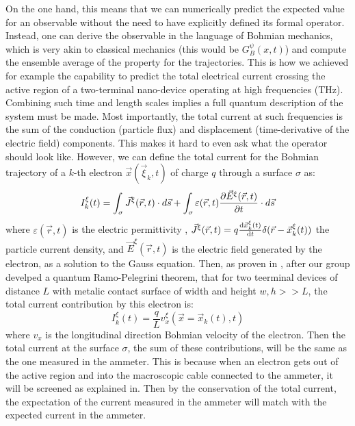 \documentclass[11pt, a4paper]{article} %
\begin{document}
On the one hand, this means that we can numerically predict the expected value for an observable without the need to have explicitly defined its formal operator. Instead, one can derive the observable in the language of Bohmian mechanics, which is very akin to classical mechanics (this would be $G^\psi_B(x,t)$) and compute the ensemble average of the property for the trajectories. This is how we achieved for example the capability to predict the total electrical current crossing the active region of a two-terminal nano-device operating at high frequencies (THz). Combining such time and length scales implies a full quantum description of the system must be made. Most importantly, the total current at such frequencies is the sum of the conduction (particle flux) and displacement (time-derivative of the electric field) components. This makes it hard to even ask what the operator should look like. However, we can define the total current for the Bohmian trajectory of a $k$-th electron $\vec{x}(\vec{\xi}_k,t)$ of charge $q$ through a surface $\sigma$ as:
\begin{equation}
I_k^\xi(t)=\int_\sigma \vec{J}^\xi(\vec{r},t)\cdot d\vec{s}+\int_\sigma \varepsilon(\vec{r},t)\pdv{\vec{E}^\xi(\vec{r},t)}{t}\cdot d\vec{s}
\end{equation}
where $\varepsilon(\vec{r},t)$ is the electric permittivity , $\vec{J}^\xi(\vec{r},t)=q\dv{\vec{x}_k^\xi(t)}{t}\delta(\vec{r}-\vec{x}_k^\xi(t))$ the particle current density, and $\vec{E}^\xi(\vec{r},t)$ is the electric field generated by the electron, as a solution to the Gauss equation. Then, as proven in \cite{}, after our group develped a quantum Ramo-Pelegrini theorem, that for two teerminal devices of distance $L$ with metalic contact surface of width and height $w,h>>L$, the total current contribution by this electron is:
\begin{equation}
I^\xi_k(t)=\frac{q}{L}v_x^\xi(\vec{x}=\vec{x}_k(t), t)
\end{equation} 
where $v_x$ is the longitudinal direction Bohmian velocity of the electron. Then the total current at the surface $\sigma$, the sum of these contributions, will be the same as the one measured in the ammeter. This is because when an electron gets out of the active region and into the macroscopic cable connected to the ammeter, it will be screened as explained in. Then by the conservation of the total current, the expectation of the current measured in the ammeter will match with the expected current in the ammeter.
\end{document}
